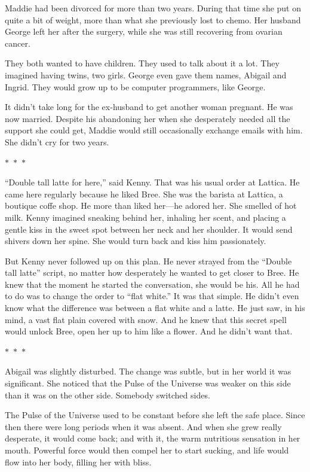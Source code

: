\documentclass{memoir}
\newcommand{\starbreak}{%
\begin{center}
  $\ast$~$\ast$~$\ast$
\end{center}
}
\begin{document}
Maddie had been divorced for more than two years. During that time she put on quite a bit of weight, more than what she previously lost to chemo. Her husband George left her after the surgery, while she was still recovering from ovarian cancer. 

They both wanted to have children. They used to talk about it a lot. They imagined having twins, two girls. George even gave them names, Abigail and Ingrid. They would grow up to be computer programmers, like George.

It didn't take long for the ex-husband to get another woman pregnant. He was now married. Despite his abandoning her when she desperately needed all the support she could get, Maddie would still occasionally exchange emails with him. She didn't cry for two years. 

\starbreak

``Double tall latte for here,'' said Kenny. That was his usual order at Lattica. He came here regularly because he liked Bree. She was the barista at Lattica, a boutique coffe shop. He more than liked her---he adored her. She smelled of hot milk. Kenny imagined sneaking behind her, inhaling her scent, and placing a gentle kiss in the sweet spot between her neck and her shoulder. It would send shivers down her spine. She would turn back and kiss him passionately. 

But Kenny never followed up on this plan. He never strayed from the ``Double tall latte'' script, no matter how desperately he wanted to get closer to Bree. He knew that the moment he started the conversation, she would be his. All he had to do was to change the order to ``flat white.'' It was that simple. He didn't even know what the difference was between a flat white and a latte. He just saw, in his mind, a vast flat plain covered with snow. And he knew that this secret spell would unlock Bree, open her up to him like a flower. And he didn't want that. 

\starbreak

Abigail was slightly disturbed. The change was subtle, but in her world it was significant. She noticed that the Pulse of the Universe was weaker on this side than it was on the other side. Somebody switched sides.

The Pulse of the Universe used to be constant before she left the safe place. Since then there were long periods when it was absent. And when she grew really desperate, it would come back; and with it, the warm nutritious sensation in her mouth. Powerful force would then compel her to start sucking, and life would flow into her body, filling her with bliss. 
\end{document}
